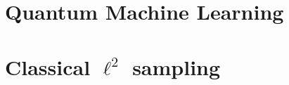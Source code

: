 \documentclass{beamer}
\newcommand\0{\mathbf{0}}
\newcommand\<{\langle}
\renewcommand\>{\rangle}
\begin{document}
\section{Quantum Machine Learning}

\begin{frame}
\frametitle{}	
\end{frame}


\section{Classical $\ell^2$ sampling}

  

 
\end{document}
